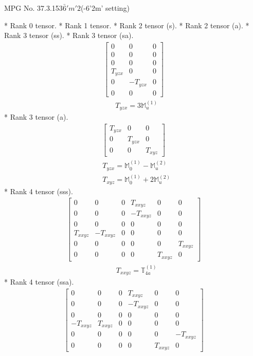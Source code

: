 \documentclass[fleqn,8pt,landscape]{jsarticle}
\begin{document}
\setcounter{MaxMatrixCols}{32}

\renewcommand{\tablename}{Table~}
\renewcommand{\figurename}{Figure~}
\begin{center}
\LARGE
MPG No. 37.3.153\quad$\bar{6}'m'2$\quad(-6'2m' setting)
\end{center}
* Rank 0 tensor.
* Rank 1 tensor.
* Rank 2 tensor (s).
* Rank 2 tensor (a).
* Rank 3 tensor (ss).
* Rank 3 tensor (sa).
\begin{align*}
\begin{bmatrix} 0 & 0 & 0 \\ 0 & 0 & 0 \\ 0 & 0 & 0 \\ T_{yzx} & 0 & 0 \\ 0 & - T_{yzx} & 0 \\ 0 & 0 & 0 \end{bmatrix}
\end{align*}
\begin{align*}
& T_{yzx} = 3 \mathbb{M}_{u}^{(1)}
\end{align*}
* Rank 3 tensor (a).
\begin{align*}
\begin{bmatrix} T_{yzx} & 0 & 0 \\ 0 & T_{yzx} & 0 \\ 0 & 0 & T_{xyz} \end{bmatrix}
\end{align*}
\begin{align*}
& T_{yzx} = \mathbb{M}_{0}^{(1)} - \mathbb{M}_{u}^{(2)} \\
& T_{xyz} = \mathbb{M}_{0}^{(1)} + 2 \mathbb{M}_{u}^{(2)}
\end{align*}
* Rank 4 tensor (sss).
\begin{align*}
\begin{bmatrix} 0 & 0 & 0 & T_{xxyz} & 0 & 0 \\ 0 & 0 & 0 & - T_{xxyz} & 0 & 0 \\ 0 & 0 & 0 & 0 & 0 & 0 \\ T_{xxyz} & - T_{xxyz} & 0 & 0 & 0 & 0 \\ 0 & 0 & 0 & 0 & 0 & T_{xxyz} \\ 0 & 0 & 0 & 0 & T_{xxyz} & 0 \end{bmatrix}
\end{align*}
\begin{align*}
& T_{xxyz} = \mathbb{T}_{4a}^{(1)}
\end{align*}
* Rank 4 tensor (ssa).
\begin{align*}
\begin{bmatrix} 0 & 0 & 0 & T_{xxyz} & 0 & 0 \\ 0 & 0 & 0 & - T_{xxyz} & 0 & 0 \\ 0 & 0 & 0 & 0 & 0 & 0 \\ - T_{xxyz} & T_{xxyz} & 0 & 0 & 0 & 0 \\ 0 & 0 & 0 & 0 & 0 & - T_{xxyz} \\ 0 & 0 & 0 & 0 & T_{xxyz} & 0 \end{bmatrix}
\end{align*}
\end{document}
